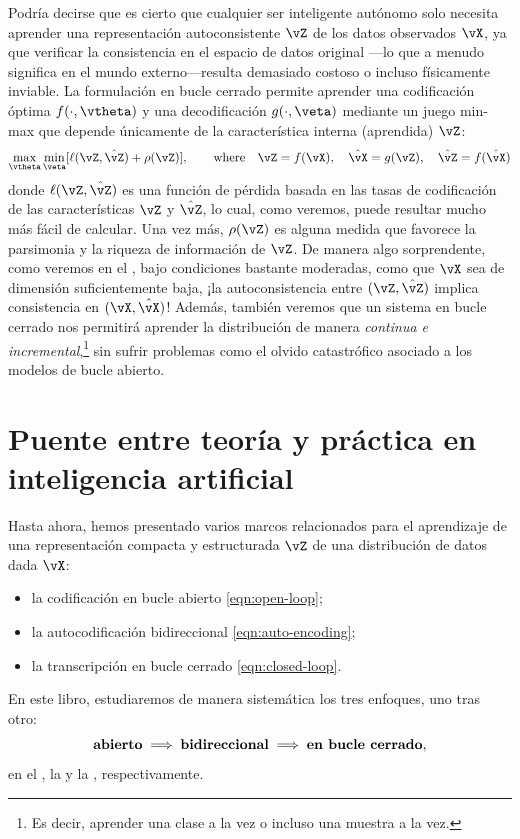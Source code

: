 \documentclass[../../book-main_es.tex]{subfiles}
\begin{document}
Podría decirse que es cierto que cualquier ser inteligente autónomo solo necesita
aprender una representación autoconsistente \(\vZ\) de los datos observados
\(\vX\), ya que verificar la consistencia en el espacio de datos original
---lo que a menudo significa en el mundo externo---resulta demasiado costoso
o incluso físicamente inviable. La formulación en bucle cerrado permite
aprender una codificación óptima \(f(\cdot, \vtheta)\) y una decodificación
\(g(\cdot, \veta)\) mediante un juego min-max que depende únicamente de la
característica interna (aprendida) \(\vZ\):
\begin{equation}
    \max_{\vtheta}\min_{\veta} [\ell( \vZ, \hat{\vZ}) + \rho(\vZ)],
    \qquad \text{where} \quad \vZ = f(\vX), \quad \hat{\vX} = g(\vZ),
    \quad \hat{\vZ} = f(\hat{\vX})
    \label{eqn:closed-loop-objective}
\end{equation}
donde \(\ell( \vZ, \hat{\vZ})\) es una función de pérdida basada en las tasas de codificación
de las características \(\vZ\) y \(\hat{\vZ}\), lo cual, como veremos,
puede resultar mucho más fácil de calcular. Una vez más, \(\rho(\vZ)\) es alguna
medida que favorece la parsimonia y la riqueza de información de \(\vZ\).
De manera algo sorprendente, como veremos en el , bajo
condiciones bastante moderadas, como que \(\vX\) sea de dimensión suficientemente
baja, ¡la autoconsistencia entre \((\vZ, \hat{\vZ})\)
implica consistencia en \((\vX, \hat{\vX})\)! Además, también veremos 
que un sistema en bucle cerrado nos permitirá aprender la
distribución de manera \textit{continua e incremental},\footnote{Es decir, aprender 
una clase a la vez o incluso una muestra a la vez.} sin sufrir problemas como
el olvido catastrófico asociado a los modelos de bucle abierto.

\section{Puente entre teoría y práctica en inteligencia artificial}
Hasta ahora, hemos presentado varios marcos relacionados para el aprendizaje de una
representación compacta y estructurada \(\vZ\) de una distribución de datos
dada \(\vX\):
\begin{itemize}
    \item la codificación en bucle abierto \eqref{eqn:open-loop};
    \item la autocodificación bidireccional \eqref{eqn:auto-encoding};
    \item la transcripción en bucle cerrado \eqref{eqn:closed-loop}.
\end{itemize}
En este libro, estudiaremos de manera sistemática los tres enfoques, uno
tras otro:
\begin{equation}
    \text{\textbf{abierto}} \; \Longrightarrow \;
    \text{\textbf{bidireccional}} \; \Longrightarrow \;
    \text{\textbf{en bucle cerrado}},
\end{equation}
en el , la 
y la , respectivamente.
\end{document}
